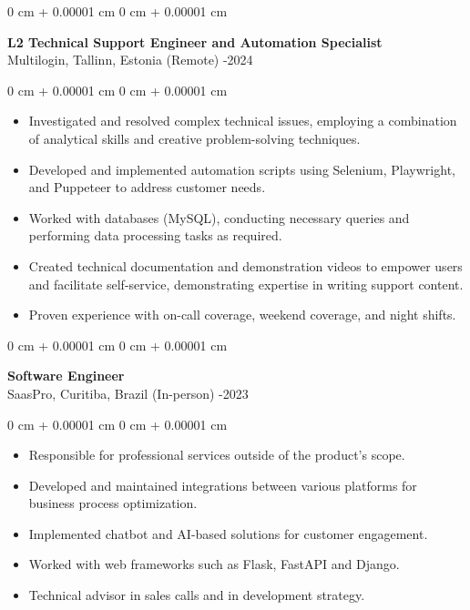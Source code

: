 \documentclass[10pt, letterpaper]{article}
\newenvironment{highlights}{
    \begin{itemize}[
        topsep=0.10 cm,
        parsep=0.10 cm,
        partopsep=0pt,
        itemsep=0pt,
        leftmargin=0 cm + 10pt
    ]
}{
    \end{itemize}
}
\newenvironment{onecolentry}{
    \begin{adjustwidth}{
        0 cm + 0.00001 cm
    }{
        0 cm + 0.00001 cm
    }
}{
    \end{adjustwidth}
}
\begin{document}
\begin{onecolentry}
    \setcolumnwidth{\fill, 4.5cm}
    \begin{paracol}{2}
        \textbf{L2 Technical Support Engineer and Automation Specialist} \\ Multilogin, Tallinn, Estonia (Remote)
        \switchcolumn
        -2024
    \end{paracol}
\end{onecolentry}
\vspace{0.10cm}
\begin{onecolentry}
    \begin{highlights}
                \item Investigated and resolved complex technical issues, employing a combination of analytical skills and creative problem-solving techniques.
                \item Developed and implemented automation scripts using Selenium, Playwright, and Puppeteer to address customer needs.
                \item Worked with databases (MySQL), conducting necessary queries and performing data processing tasks as required.
                \item Created technical documentation and demonstration videos to empower users and facilitate self-service, demonstrating expertise in writing support content.
                \item Proven experience with on-call coverage, weekend coverage, and night shifts.
    \end{highlights}
\end{onecolentry}

\vspace{0.2cm}

\begin{onecolentry}
    \setcolumnwidth{\fill, 4.5cm}
    \begin{paracol}{2}
        \textbf{Software Engineer} \\ SaasPro, Curitiba, Brazil (In-person)
        \switchcolumn
        -2023
    \end{paracol}
\end{onecolentry}
\vspace{0.10cm}
\begin{onecolentry}
    \begin{highlights}
                \item Responsible for professional services outside of the product’s scope.
                \item Developed and maintained integrations between various platforms for business process optimization.
                \item Implemented chatbot and AI-based solutions for customer engagement.
                \item Worked with web frameworks such as Flask, FastAPI and Django.
                \item Technical advisor in sales calls and in development strategy.
    \end{highlights}
\end{onecolentry}
\end{document}
